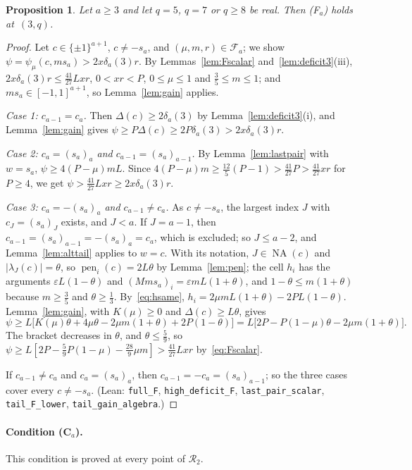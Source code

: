\documentclass[11pt]{article}
\newtheorem{proposition}[theorem]{Proposition}
\theoremstyle{remark}
\newcommand{\NA}{\operatorname{NA}}
\begin{document}
\begin{proposition}\label{prop:F}
Let $a\ge3$ and let $q=5$, $q=7$ or $q\ge8$ be real. Then (F$_a$) holds at~$(3,q)$.
\end{proposition}
\begin{proof}
Let $c\in\{\pm1\}^{a+1}$, $c\ne-s_a$, and $(\mu,m,r)\in\mathcal F_a$; we show
$\psi=\psi_\mu(c,ms_a)>2x\delta_a(3)r$. By Lemmas~\ref{lem:Fscalar}
and~\ref{lem:deficit3}(iii), $2x\delta_a(3)r\le\frac{41}{27}Lxr$, $0<xr<P$,
$0\le\mu\le1$ and $\frac35\le m\le1$; and $ms_a\in[-1,1]^{a+1}$, so
Lemma~\ref{lem:gain} applies.

\emph{Case 1: $c_{a-1}=c_a$.} Then $\Delta(c)\ge2\delta_a(3)$ by
Lemma~\ref{lem:deficit3}(i), and Lemma~\ref{lem:gain} gives
$\psi\ge P\Delta(c)\ge2P\delta_a(3)>2x\delta_a(3)r$.

\emph{Case 2: $c_a=(s_a)_a$ and $c_{a-1}=(s_a)_{a-1}$.} By
Lemma~\ref{lem:lastpair} with $w=s_a$, $\psi\ge4(P-\mu)mL$. Since
$4(P-\mu)m\ge\frac{12}5(P-1)>\frac{41}{27}P>\frac{41}{27}xr$ for $P\ge4$, we get
$\psi>\frac{41}{27}Lxr\ge2x\delta_a(3)r$.

\emph{Case 3: $c_a=-(s_a)_a$ and $c_{a-1}\ne c_a$.} As $c\ne-s_a$, the largest
index $J$ with $c_J=(s_a)_J$ exists, and $J<a$. If $J=a-1$, then
$c_{a-1}=(s_a)_{a-1}=-(s_a)_a=c_a$, which is excluded; so $J\le a-2$, and
Lemma~\ref{lem:alttail} applies to $w=c$. With its notation, $J\in\NA(c)$ and
$|\lambda_J(c)|=\theta$, so $\operatorname{pen}_i(c)=2L\theta$ by
Lemma~\ref{lem:pen}; the cell $h_i$ has the arguments $\varepsilon L(1-\theta)$ and
$(M ms_a)_i=\varepsilon mL(1+\theta)$, and $1-\theta\le m(1+\theta)$ because
$m\ge\frac35$ and $\theta\ge\frac13$. By~\eqref{eq:hsame},
$h_i=2\mu mL(1+\theta)-2PL(1-\theta)$. Lemma~\ref{lem:gain}, with $K(\mu)\ge0$ and
$\Delta(c)\ge L\theta$, gives
\[
\psi\ge L\bigl[K(\mu)\theta+4\mu\theta-2\mu m(1+\theta)+2P(1-\theta)\bigr]
=L\bigl[2P-P(1-\mu)\theta-2\mu m(1+\theta)\bigr].
\]
The bracket decreases in $\theta$, and $\theta\le\frac59$, so
$\psi\ge L[2P-\frac59P(1-\mu)-\frac{28}9\mu m]>\frac{41}{27}Lxr$
by~\eqref{eq:Fscalar}.

If $c_{a-1}\ne c_a$ and $c_a=(s_a)_a$, then $c_{a-1}=-c_a=(s_a)_{a-1}$; so the
three cases cover every $c\ne-s_a$. (Lean: \texttt{full\_F},
\texttt{high\_deficit\_F}, \texttt{last\_pair\_scalar}, \texttt{tail\_F\_lower},
\texttt{tail\_gain\_algebra}.)
\end{proof}

\paragraph{Condition (C$_a$).} This condition is proved at every point of
$\mathcal R_2$.
\end{document}
